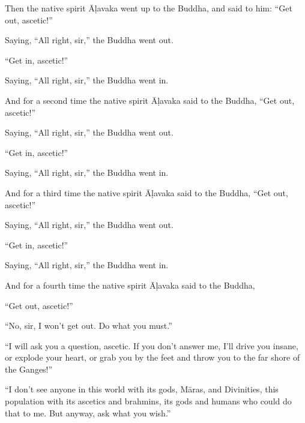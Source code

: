 \documentclass[12pt,openany]{book}%
\begin{document}
Then the native spirit \textsanskrit{Āḷavaka} went up to the Buddha, and said to him: “Get out, ascetic!” 

Saying, “All right, sir,” the Buddha went out. 

“Get in, ascetic!” 

Saying, “All right, sir,” the Buddha went in. 

And for a second time the native spirit \textsanskrit{Āḷavaka} said to the Buddha, “Get out, ascetic!” 

Saying, “All right, sir,” the Buddha went out. 

“Get in, ascetic!” 

Saying, “All right, sir,” the Buddha went in. 

And for a third time the native spirit \textsanskrit{Āḷavaka} said to the Buddha, “Get out, ascetic!” 

Saying, “All right, sir,” the Buddha went out. 

“Get in, ascetic!” 

Saying, “All right, sir,” the Buddha went in. 

And for a fourth time the native spirit \textsanskrit{Āḷavaka} said to the Buddha, 

“Get out, ascetic!” 

“No, sir, I won’t get out. Do what you must.” 

“I will ask you a question, ascetic. If you don’t answer me, I’ll drive you insane, or explode your heart, or grab you by the feet and throw you to the far shore of the Ganges!” 

“I don’t see anyone in this world with its gods, \textsanskrit{Māras}, and Divinities, this population with its ascetics and brahmins, its gods and humans who could do that to me. But anyway, ask what you wish.” 
\end{document}
